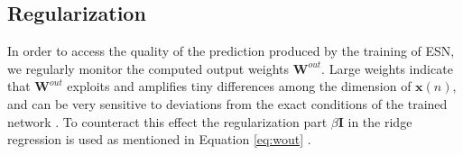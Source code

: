 \subsection{Regularization}
In order to access the quality of the prediction produced by the training of ESN, we regularly monitor the computed output weights $\mathbf{W}^{out}$. Large weights indicate that $\mathbf{W}^{out}$ exploits and amplifies tiny differences among the dimension of  $\mathbf{x}(n)$, and can be very sensitive to deviations from the exact conditions of the trained network \cite{mantas}. To counteract this effect the regularization part $\beta \mathbf{I}$ in the ridge regression is used as mentioned in Equation  \eqref{eq:wout} .




 
